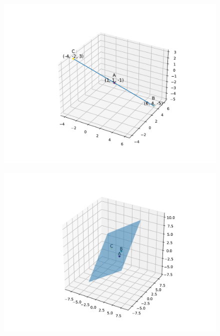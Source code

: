 \begin{figure}[H]
  \centering
   \includegraphics[width=0.75\columnwidth]{chapters/12/11/3/6/figs/fig.pdf}
    \caption{}
     \label{fig:chapters/12/11/3/6/1}
     \end{figure}
\begin{figure}[H]
  \centering
   \includegraphics[width=0.75\columnwidth]{chapters/12/11/3/6/figs/fig1.pdf}
    \caption{}
     \label{fig:chapters/12/11/3/6/2}
     \end{figure}
